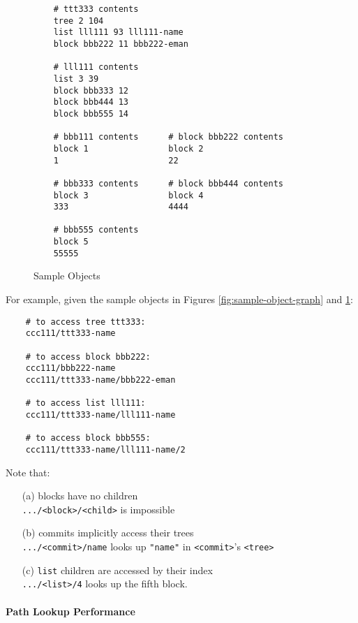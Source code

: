 \documentclass{sig-alternate}
\begin{document}
\begin{figure}
\begin{verbatim}
    # ttt333 contents
    tree 2 104
    list lll111 93 lll111-name
    block bbb222 11 bbb222-eman

    # lll111 contents
    list 3 39
    block bbb333 12
    block bbb444 13
    block bbb555 14

    # bbb111 contents      # block bbb222 contents
    block 1                block 2
    1                      22

    # bbb333 contents      # block bbb444 contents
    block 3                block 4
    333                    4444

    # bbb555 contents
    block 5
    55555
\end{verbatim}
\caption{Sample Objects} \label{fig:sample-objects}
\end{figure}

For example, given the sample objects in Figures \ref{fig:sample-object-graph} and \ref{fig:sample-objects}:

\begin{verbatim}
    # to access tree ttt333:
    ccc111/ttt333-name

    # to access block bbb222:
    ccc111/bbb222-name
    ccc111/ttt333-name/bbb222-eman

    # to access list lll111:
    ccc111/ttt333-name/lll111-name

    # to access block bbb555:
    ccc111/ttt333-name/lll111-name/2
\end{verbatim}

Note that:
\begin{itemize}
  \item[(a)] blocks have no children \\
             \texttt{.../<block>/<child>} is impossible
  \item[(b)] commits implicitly access their trees \\
             \texttt{.../<commit>/name}
             looks up \texttt{"name"} in \texttt{<commit>}'s \texttt{<tree>}
  \item[(c)] \texttt{list} children are accessed by their index \\
             \texttt{.../<list>/4} looks up the fifth block.
\end{itemize}

\paragraph{Path Lookup Performance}
\end{document}
